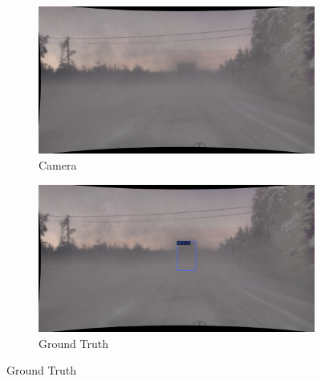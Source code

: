 \documentclass[report.tex]{subfiles}
\begin{document}
    \begin{figure}[ht]
        \centering
        
        \begin{subfigure}{.5\textwidth}
            \centering
            \includegraphics[width=.9\linewidth]{images/adverse_weather_influence_on_sensor/camera_1.png}
            \caption{Camera}
            \label{fig:camera_image_in_fog}
        \end{subfigure}%
        \begin{subfigure}{.5\textwidth}
            \centering
            \includegraphics[width=.9\linewidth]{images/adverse_weather_influence_on_sensor/gt.png}
            \caption{Ground Truth}
            \label{fig:gt_in_fog}
        \end{subfigure}
        

\end{figure}
\end{document}
